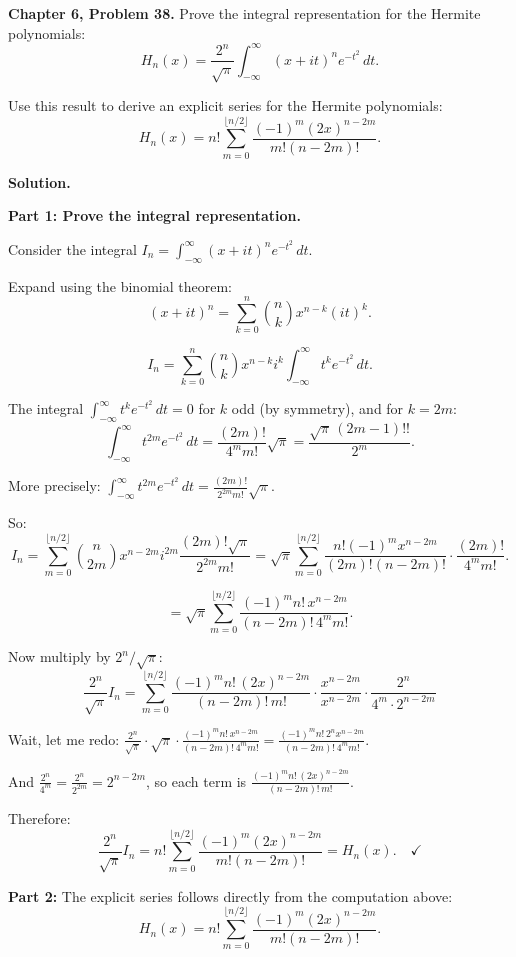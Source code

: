 \documentclass[12pt]{article}
\begin{document}
\textbf{Chapter 6, Problem 38.} Prove the integral representation for the Hermite polynomials:
\[
H_n(x) = \frac{2^n}{\sqrt{\pi}}\int_{-\infty}^{\infty}(x+it)^n e^{-t^2}\,dt.
\]

Use this result to derive an explicit series for the Hermite polynomials:
\[
H_n(x) = n!\sum_{m=0}^{\lfloor n/2\rfloor}\frac{(-1)^m(2x)^{n-2m}}{m!(n-2m)!}.
\]

\bigskip
\textbf{Solution.}

\textbf{Part 1: Prove the integral representation.}

Consider the integral $I_n = \int_{-\infty}^{\infty}(x+it)^n e^{-t^2}\,dt$.

Expand using the binomial theorem:
\[
(x+it)^n = \sum_{k=0}^{n}\binom{n}{k}x^{n-k}(it)^k.
\]

\[
I_n = \sum_{k=0}^{n}\binom{n}{k}x^{n-k}i^k\int_{-\infty}^{\infty}t^k e^{-t^2}\,dt.
\]

The integral $\int_{-\infty}^{\infty}t^k e^{-t^2}\,dt = 0$ for $k$ odd (by symmetry), and for $k = 2m$:
\[
\int_{-\infty}^{\infty}t^{2m}e^{-t^2}\,dt = \frac{(2m)!}{4^m m!}\sqrt{\pi} = \frac{\sqrt{\pi}\,(2m-1)!!}{2^m}.
\]

More precisely: $\int_{-\infty}^{\infty}t^{2m}e^{-t^2}\,dt = \frac{(2m)!}{2^{2m}m!}\sqrt{\pi}$.

So:
\[
I_n = \sum_{m=0}^{\lfloor n/2\rfloor}\binom{n}{2m}x^{n-2m}i^{2m}\frac{(2m)!\sqrt{\pi}}{2^{2m}m!} = \sqrt{\pi}\sum_{m=0}^{\lfloor n/2\rfloor}\frac{n!(-1)^m x^{n-2m}}{(2m)!(n-2m)!}\cdot\frac{(2m)!}{4^m m!}.
\]

\[
= \sqrt{\pi}\sum_{m=0}^{\lfloor n/2\rfloor}\frac{(-1)^m n!\, x^{n-2m}}{(n-2m)!\,4^m m!}.
\]

Now multiply by $2^n/\sqrt{\pi}$:
\[
\frac{2^n}{\sqrt{\pi}}I_n = \sum_{m=0}^{\lfloor n/2\rfloor}\frac{(-1)^m n!\,(2x)^{n-2m}}{(n-2m)!\,m!}\cdot\frac{x^{n-2m}}{x^{n-2m}} \cdot \frac{2^n}{4^m \cdot 2^{n-2m}}
\]

Wait, let me redo: $\frac{2^n}{\sqrt{\pi}}\cdot\sqrt{\pi}\cdot\frac{(-1)^m n!\,x^{n-2m}}{(n-2m)!\,4^m m!} = \frac{(-1)^m n!\,2^n x^{n-2m}}{(n-2m)!\,4^m m!}$.

And $\frac{2^n}{4^m} = \frac{2^n}{2^{2m}} = 2^{n-2m}$, so each term is $\frac{(-1)^m n!\,(2x)^{n-2m}}{(n-2m)!\,m!}$.

Therefore:
\[
\frac{2^n}{\sqrt{\pi}}I_n = n!\sum_{m=0}^{\lfloor n/2\rfloor}\frac{(-1)^m(2x)^{n-2m}}{m!(n-2m)!} = H_n(x). \quad \checkmark
\]

\textbf{Part 2:} The explicit series follows directly from the computation above:
\[
\boxed{H_n(x) = n!\sum_{m=0}^{\lfloor n/2\rfloor}\frac{(-1)^m(2x)^{n-2m}}{m!(n-2m)!}.}
\]
\end{document}
